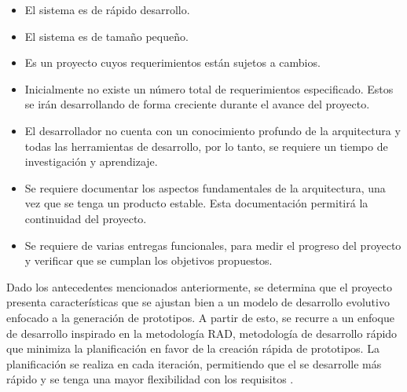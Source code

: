 \newpage
\begin{itemize}
	\item El sistema es de rápido desarrollo.
	\item El sistema es de tamaño pequeño.
	\item Es un proyecto cuyos requerimientos están sujetos a cambios.
	\item Inicialmente no existe un número total de requerimientos especificado. Estos se irán desarrollando de forma creciente durante el avance del proyecto.
	\item El desarrollador no cuenta con un conocimiento profundo de la arquitectura y todas las herramientas de desarrollo, por lo tanto, se requiere un tiempo de investigación y aprendizaje.   
	\item Se requiere documentar los aspectos fundamentales de la arquitectura, una vez que se tenga un producto estable. Esta documentación permitirá la continuidad del proyecto. 
	\item Se requiere de varias entregas funcionales, para medir el progreso del proyecto y verificar que se cumplan los objetivos propuestos.
\end{itemize}

Dado los antecedentes mencionados anteriormente, se determina que el proyecto presenta características que se ajustan bien a un modelo de desarrollo evolutivo enfocado a la generación de prototipos. A partir de esto, se recurre a un enfoque de desarrollo inspirado en la metodología RAD, metodología de desarrollo rápido que minimiza la planificación en favor de la creación rápida de prototipos. La planificación se realiza en cada iteración, permitiendo que el  se desarrolle más rápido y se tenga una mayor flexibilidad con los requisitos \parencite{mcconnell1996rapid}.

